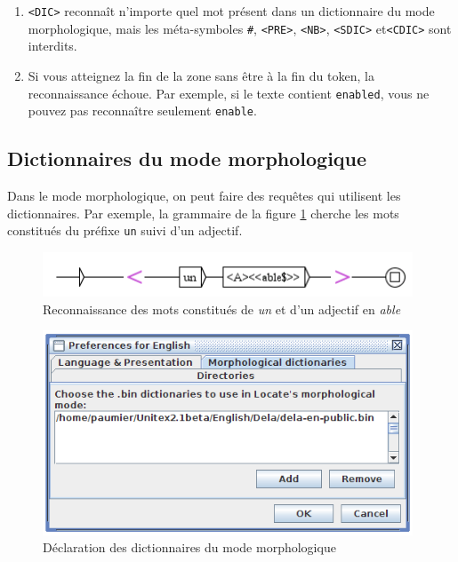 \begin{enumerate}
\item \verb+<DIC>+ reconnaît n'importe quel mot présent dans un dictionnaire du mode
	 morphologique, mais les méta-symboles \verb+#+, \verb+<PRE>+, \verb+<NB>+,
 	 \verb+<SDIC>+ et\verb+<CDIC>+ sont interdits.\index{\verb+#+}  

\item Si vous atteignez la fin de la zone sans être à la fin du token, la reconnaissance échoue.
	Par exemple, si le texte contient \verb+enabled+, vous ne pouvez pas reconnaître seulement
	\verb+enable+.
\end{enumerate}

\subsection{Dictionnaires du mode morphologique}
\label{dic-mode-morpho}
Dans le mode morphologique, on peut faire des requêtes qui utilisent les dictionnaires.
Par exemple,  la grammaire de la figure \ref{fig-morpho3} cherche les mots constitués du préfixe \verb+un+ suivi d'un adjectif.

\begin{figure}[!ht]
\begin{center}
\includegraphics[width=11cm]{resources/img/fig6-17m.png}
\caption{Reconnaissance des mots constitués de \textit{un} et d'un adjectif en 
\textit{able}\label{fig-morpho3}}
\end{center}
\end{figure}

\begin{figure}[!ht]
\begin{center}
\includegraphics[width=11cm]{resources/img/fig6-17n.png}
\caption{Déclaration des dictionnaires du mode morphologique\label{fig-morpho4}}
\end{center}
\end{figure}

